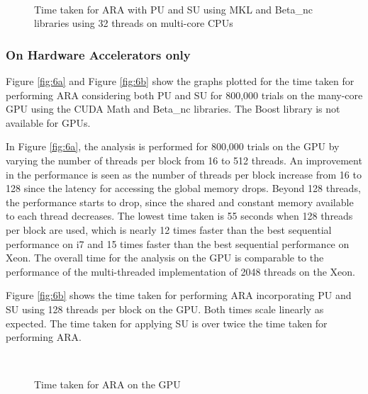 \begin{figure} \centering
	 \\
\caption{Time taken for ARA with PU and SU using MKL and Beta\_nc libraries using 32 threads on multi-core CPUs}
\label{figure5}
\end{figure}




\subsubsection{On Hardware Accelerators only}



Figure \ref{fig:6a} and Figure \ref{fig:6b} show the graphs plotted for the time taken for performing ARA considering both PU and SU for 800,000 trials on the many-core GPU using the CUDA Math and Beta\_nc libraries. The Boost library is not available for GPUs. 

In Figure \ref{fig:6a}, the analysis is performed for 800,000 trials on the GPU by varying the number of threads per block from 16 to 512 threads. 
An improvement in the performance is seen as the number of threads per block increase from 16 to 128 since the latency for accessing the global memory drops. 
Beyond 128 threads, the performance starts to drop, since the shared and constant memory available to each thread decreases. 
The lowest time taken is 55 seconds when 128 threads per block are used, which is nearly 12 times faster than the best sequential performance on i7 and 15 times faster than the best sequential performance on Xeon. 
The overall time for the analysis on the GPU is comparable to the performance of the multi-threaded implementation of 2048 threads on the Xeon.

Figure \ref{fig:6b} shows the time taken for performing ARA incorporating PU and SU using 128 threads per block on the GPU. Both times scale linearly as expected. The time taken for applying SU is over twice the time taken for performing ARA.

\begin{figure} \centering
	 \\
\caption{Time taken for ARA on the GPU}
\label{figure6}
\end{figure}








